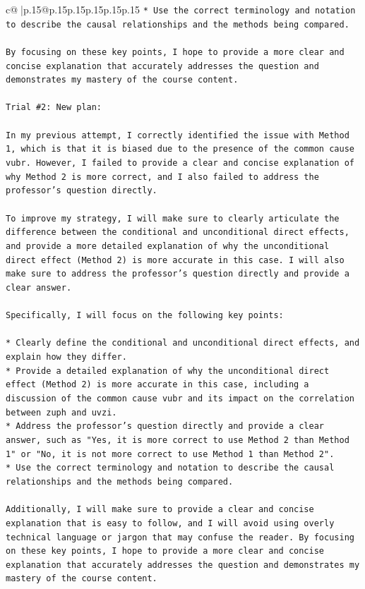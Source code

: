 \documentclass{article}
\begin{document}
{\begin{supertabular}{c@{$\;$}|p{.15\linewidth}@{}p{.15\linewidth}p{.15\linewidth}p{.15\linewidth}p{.15\linewidth}p{.15\linewidth}}
{{{\texttt{* Use the correct terminology and notation to describe the causal relationships and the methods being compared.} \\
\\ 
\texttt{By focusing on these key points, I hope to provide a more clear and concise explanation that accurately addresses the question and demonstrates my mastery of the course content.} \\
\\ 
\texttt{Trial \#2: New plan: } \\
\\ 
\texttt{In my previous attempt, I correctly identified the issue with Method 1, which is that it is biased due to the presence of the common cause vubr. However, I failed to provide a clear and concise explanation of why Method 2 is more correct, and I also failed to address the professor's question directly. } \\
\\ 
\texttt{To improve my strategy, I will make sure to clearly articulate the difference between the conditional and unconditional direct effects, and provide a more detailed explanation of why the unconditional direct effect (Method 2) is more accurate in this case. I will also make sure to address the professor's question directly and provide a clear answer.} \\
\\ 
\texttt{Specifically, I will focus on the following key points:} \\
\\ 
\texttt{* Clearly define the conditional and unconditional direct effects, and explain how they differ.} \\
\texttt{* Provide a detailed explanation of why the unconditional direct effect (Method 2) is more accurate in this case, including a discussion of the common cause vubr and its impact on the correlation between zuph and uvzi.} \\
\texttt{* Address the professor's question directly and provide a clear answer, such as "Yes, it is more correct to use Method 2 than Method 1" or "No, it is not more correct to use Method 1 than Method 2".} \\
\texttt{* Use the correct terminology and notation to describe the causal relationships and the methods being compared.} \\
\\ 
\texttt{Additionally, I will make sure to provide a clear and concise explanation that is easy to follow, and I will avoid using overly technical language or jargon that may confuse the reader. By focusing on these key points, I hope to provide a more clear and concise explanation that accurately addresses the question and demonstrates my mastery of the course content.} \\
}}}
\end{supertabular}}
\end{document}
